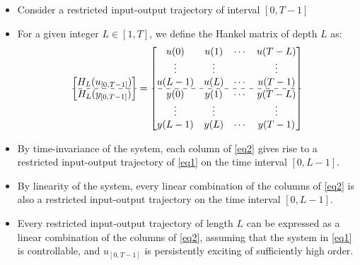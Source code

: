 \documentclass[hyperref={pdfpagemode=FullScreen},aspectratio=169]{beamer}
\begin{document}
\begin{frame}{}
\begin{itemize}
\setlength\itemsep{0.5em}
\item Consider a restricted input-output trajectory of interval $[0,T-1]$
\item For a given integer $L\in [1,T]$, we define the Hankel matrix of depth $L$ as:
\begin{align}\label{eq2}
\begin{bmatrix}
H_L(u_{[0,T-1]}) \\ 
\hdashline 
H_L(y_{[0,T-1]})
\end{bmatrix} = \begin{bmatrix}
u(0) & u(1) & \cdots & u(T-L) \\
\vdots & \vdots & & \vdots \\
u(L-1) & u(L) & \cdots & u(T-1) \\
\hdashline 
y(0) & y(1) & \cdots & y(T-L) \\
\vdots & \vdots & & \vdots \\
y(L-1) & y(L) & \cdots & y(T-1)
\end{bmatrix}
\end{align}
\item By time-invariance of the system, each column of \cref{eq2} gives rise to a restricted input-output trajectory of \cref{eq1} on the time interval $[0, L-1]$.
\item By linearity of the system, every linear combination of the columns of \cref{eq2} is also a restricted input-output trajectory on the time interval $[0, L-1]$.
\item Every restricted input-output trajectory of length $L$ can be expressed as a linear combination of the columns of \cref{eq2}, assuming that the system in \cref{eq1} is controllable, and $u_{[0,T-1]}$ is persistently exciting of sufficiently high order.
\end{itemize}
\end{frame}
\end{document}
